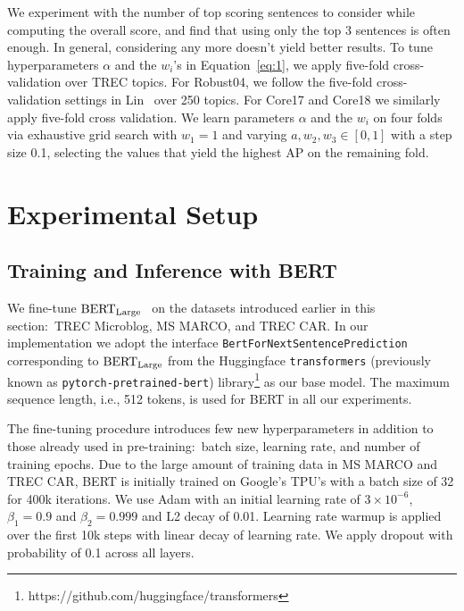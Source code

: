 We experiment with the number of top scoring sentences to consider while computing the overall score, and find that using only the top 3 sentences is often enough.
In general, considering any more doesn't yield better results.
To tune hyperparameters $ \alpha $ and the $ w_i $'s  in Equation~\ref{eq:1}, we apply five-fold cross-validation over TREC topics.
For Robust04, we follow the five-fold cross-validation settings in Lin~\cite{lin2019neural} over 250 topics.
For Core17 and Core18 we similarly apply five-fold cross validation.
We learn parameters $\alpha$ and the $w_i$ on four folds via exhaustive grid search with $ w_1 = 1 $ and varying $ a, w_2, w_3 \in [0, 1] $ with a step size 0.1, selecting the values that yield the highest AP on the remaining fold.

\section{Experimental Setup}

\subsection{Training and Inference with BERT}

We fine-tune $ \textrm{BERT}_{\textrm{\scriptsize Large}} $~\cite{devlin2018bert} on the datasets introduced earlier in this section:\ TREC Microblog, MS MARCO, and TREC CAR.
In our implementation we adopt the interface \texttt{BertForNextSentencePrediction} corresponding to $ \textrm{BERT}_{\textrm{\scriptsize Large}} $ from the Huggingface \texttt{transformers} (previously known as \texttt{pytorch-pretrained-bert}) library\footnote{https://github.com/huggingface/transformers} as our base model.
The maximum sequence length, i.e., 512 tokens, is used for BERT in all our experiments.

The fine-tuning procedure introduces few new hyperparameters in addition to those already used in pre-training:\ batch size, learning rate, and number of training epochs.
Due to the large amount of training data in MS MARCO and TREC CAR, BERT is initially trained on Google's TPU's with a batch size of 32 for 400k iterations.
We use Adam \cite{kingma2014adam} with an initial learning rate of $ 3 \times 10^{-6}$, $ \beta_1 = 0.9 $ and $ \beta_2 = 0.999 $ and L2 decay of 0.01.
Learning rate warmup is applied over the first 10k steps with linear decay of learning rate.
We apply dropout with probability of 0.1 across all layers.

